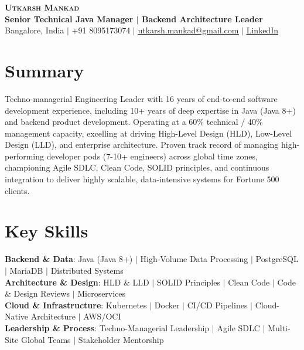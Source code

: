 \documentclass[letterpaper,11pt]{article}
\begin{document}
\begin{center}
    \textbf{\Huge \scshape Utkarsh Mankad} \\ \vspace{4pt} 
    \textbf{Senior Technical Java Manager $|$ Backend Architecture Leader}\\ \vspace{4pt}
    \small
    Bangalore, India $|$ +91 8095173074 $|$ \href{mailto:utkarsh.mankad@gmail.com}{\underline{utkarsh.mankad@gmail.com}} $|$ \href{https://linkedin.com/in/utkarsh-mankad}{\underline{LinkedIn}}
\end{center}

\section{Summary}
Techno-managerial Engineering Leader with 16 years of end-to-end software development experience, including 10+ years of deep expertise in Java (Java 8+) and backend product development. Operating at a 60\% technical / 40\% management capacity, excelling at driving High-Level Design (HLD), Low-Level Design (LLD), and enterprise architecture. Proven track record of managing high-performing developer pods (7-10+ engineers) across global time zones, championing Agile SDLC, Clean Code, SOLID principles, and continuous integration to deliver highly scalable, data-intensive systems for Fortune 500 clients.

\section{Key Skills}
 \begin{itemize}[leftmargin=0.15in, label={}]
    \small{\item{
     \textbf{Backend \& Data}{: Java (Java 8+) $|$ High-Volume Data Processing $|$ PostgreSQL $|$ MariaDB $|$ Distributed Systems} \\ \vspace{3pt}
     \textbf{Architecture \& Design}{: HLD \& LLD $|$ SOLID Principles $|$ Clean Code $|$ Code \& Design Reviews $|$ Microservices} \\ \vspace{3pt}
     \textbf{Cloud \& Infrastructure}{: Kubernetes $|$ Docker $|$ CI/CD Pipelines $|$ Cloud-Native Architecture $|$ AWS/OCI} \\ \vspace{3pt}
     \textbf{Leadership \& Process}{: Techno-Managerial Leadership $|$ Agile SDLC $|$ Multi-Site Global Teams $|$ Stakeholder Mentorship}
    }}
 \end{itemize}
\end{document}
